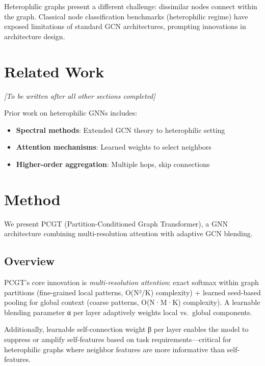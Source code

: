 \documentclass[11pt, a4paper]{article}
\begin{document}
Heterophilic graphs present a different challenge: dissimilar nodes connect within the graph. Classical node classification benchmarks (heterophilic regime) have exposed limitations of standard GCN architectures, prompting innovations in architecture design.

\section{Related Work}

\emph{[To be written after all other sections completed]}

Prior work on heterophilic GNNs includes:
\begin{itemize}
    \item \textbf{Spectral methods}: Extended GCN theory to heterophilic setting
    \item \textbf{Attention mechanisms}: Learned weights to select neighbors
    \item \textbf{Higher-order aggregation}: Multiple hops, skip connections
\end{itemize}

\section{Method}

We present PCGT (Partition-Conditioned Graph Transformer), a GNN architecture combining multi-resolution attention with adaptive GCN blending.

\subsection{Overview}

PCGT's core innovation is \emph{multi-resolution attention}: exact softmax within graph partitions (fine-grained local patterns, O(N²/K) complexity) + learned seed-based pooling for global context (coarse patterns, O(N·M·K) complexity). A learnable blending parameter α per layer adaptively weights local vs.\ global components.

Additionally, learnable self-connection weight β per layer enables the model to suppress or amplify self-features based on task requirements—critical for heterophilic graphs where neighbor features are more informative than self-features.
\end{document}
